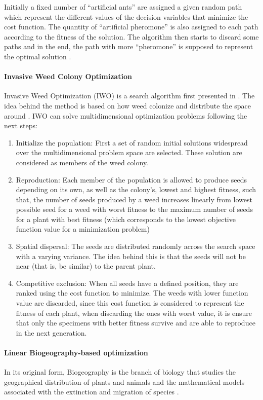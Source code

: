 Initially a fixed number of ``artificial ants'' are assigned a given random path which represent the different values of the decision variables that minimize the cost function. The quantity of ``artificial pheromone'' is also assigned to each path according to the fitness of the solution. The algorithm then starts to discard some paths and in the end, the path with more ``pheromone'' is supposed to represent the optimal solution \citep{Goss1989}.
%
\paragraph{Invasive Weed Colony Optimization}
\label{sec:IWO}
%
Invasive Weed Optimization (IWO) is a search algorithm first presented in \citet{Mehrabian2006a}. The idea behind the method is based on how weed colonize and distribute the space around \citep{Binitha2012}. IWO can solve multidimensional optimization problems following the next steps:
%
\begin{enumerate}
	\item Initialize the population: First a set of random initial solutions widespread over the multidimensional problem space are selected. These solution are considered as members of the weed colony. %
	\item Reproduction: Each member of the population is allowed to produce seeds depending on its own, as well as the colony's, lowest and highest fitness, such that, the number of seeds produced by a weed increases linearly from lowest possible seed for a weed with worst fitness to the maximum number of seeds for a plant with best fitness (which corresponds to the lowest objective function value for a minimization problem)\citep{Kundu2011}%
	\item Spatial dispersal: The seeds are distributed randomly across the search space with a varying variance. The idea behind this is that the seeds will not be near (that is, be similar) to the parent plant.
	\item Competitive exclusion: When all seeds have a defined position, they are ranked using the cost function to minimize. The weeds with lower function value are discarded, since this cost function is considered to represent the fitness of each plant, when discarding the ones with worst value, it is ensure that only the specimens with better fitness survive and are able to reproduce in the next generation.
\end{enumerate}
%
\paragraph{Linear Biogeography-based optimization}
In its original form, Biogeography is the branch of biology that studies the geographical distribution of plants and animals and the mathematical models associated with the extinction and migration of species \citep{MacArthur1967}.

